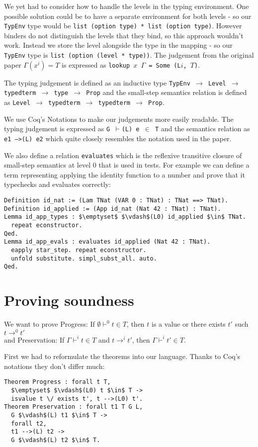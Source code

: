 \documentclass[runningheads]{article}
\begin{document}
We yet had to consider how to handle the levels in the typing environment. One possible solution could be to have a separate environment for both levels - so our \texttt{TypEnv} type would be \texttt{list (option type) * list (option type)}. However binders do not distinguish the levels that they bind, so this approach wouldn't work. Instead we store the level alongside the type in the mapping - so our \texttt{TypEnv} type is \texttt{list (option (level * type))}. The judgement from the original paper $\Gamma(x^i) = T$ is expressed as \texttt{lookup $x$ $\Gamma$ = Some (L$i$, $T$)}.

The typing judgement is defined as an inductive type \texttt{TypEnv $\to$ Level $\to$ typedterm $\to$ type $\to$ Prop} and the small-step semantics relation is defined as \texttt{Level $\to$ typedterm $\to$ typedterm $\to$ Prop}. 

We use Coq's Notations to make our judgements more easily readable. The typing judgement is expressed as \texttt{G $\vdash$(L) e $\in$ T} and the semantics relation as \texttt{e1 -->(L) e2} which quite closely resembles the notation used in the paper.

We also define a relation \texttt{evaluates} which is the reflexive transitive closure of small-step semantics at level 0 that is used in tests. For example we can define a term representing applying the identity function to a number and prove that it typechecks and evaluates correctly:
\begin{lstlisting}[mathescape=true]
Definition id_nat := (Lam TNat (VAR 0 : TNat) : TNat ==> TNat).
Definition id_applied := (App id_nat (Nat 42 : TNat) : TNat).
Lemma id_app_types : $\emptyset$ $\vdash$(L0) id_applied $\in$ TNat.
  repeat econstructor.
Qed.
Lemma id_app_evals : evaluates id_applied (Nat 42 : TNat).
  eapply star_step. repeat econstructor.
  unfold substitute. simpl_subst_all. auto.
Qed.
\end{lstlisting}



\section{Proving soundness}
We want to prove Progress: If $\emptyset \vdash^0 t \in T$, then $t$ is a value or there exists $t'$ such $t \longrightarrow^0 t'$
\\
and Preservation: If $\Gamma \vdash^i t \in T$ and $t \longrightarrow^i t'$, then $\Gamma \vdash^i t' \in T$.


First we had to reformulate the theorems into our language. Thanks to Coq's notations they don't differ much:
\begin{lstlisting}[mathescape=true]
Theorem Progress : forall t T,
  $\emptyset$ $\vdash$(L0) t $\in$ T ->
  isvalue t \/ exists t', t -->(L0) t'.
Theorem Preservation : forall t1 T G L,
  G $\vdash$(L) t1 $\in$ T ->
  forall t2,
  t1 -->(L) t2 ->
  G $\vdash$(L) t2 $\in$ T.
\end{lstlisting}
\end{document}
